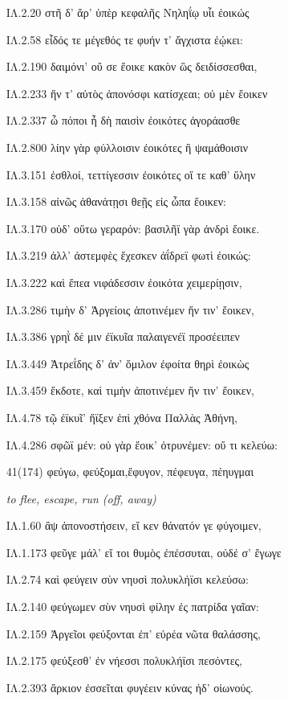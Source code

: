 \begin{enumerate}
{ΙΛ.2.20 στῆ δ' ἄρ' ὑπὲρ κεφαλῆς Νηληΐῳ υἷι ἐοικώς

ΙΛ.2.58 εἶδός τε μέγεθός τε φυήν τ' ἄγχιστα ἐῴκει:

ΙΛ.2.190 δαιμόνι' οὔ σε ἔοικε κακὸν ὣς δειδίσσεσθαι,

ΙΛ.2.233 ἥν τ' αὐτὸς ἀπονόσφι κατίσχεαι; οὐ μὲν ἔοικεν

ΙΛ.2.337 ὦ πόποι ἦ δὴ παισὶν ἐοικότες ἀγοράασθε

ΙΛ.2.800 λίην γὰρ φύλλοισιν ἐοικότες ἢ ψαμάθοισιν

ΙΛ.3.151 ἐσθλοί, τεττίγεσσιν ἐοικότες οἵ τε καθ' ὕλην

ΙΛ.3.158 αἰνῶς ἀθανάτῃσι θεῇς εἰς ὦπα ἔοικεν:

ΙΛ.3.170 οὐδ' οὕτω γεραρόν: βασιλῆϊ γὰρ ἀνδρὶ ἔοικε.

ΙΛ.3.219 ἀλλ' ἀστεμφὲς ἔχεσκεν ἀΐδρεϊ φωτὶ ἐοικώς:

ΙΛ.3.222 καὶ ἔπεα νιφάδεσσιν ἐοικότα χειμερίῃσιν,

ΙΛ.3.286 τιμὴν δ' Ἀργείοις ἀποτινέμεν ἥν τιν' ἔοικεν,

ΙΛ.3.386 γρηῒ δέ μιν ἐϊκυῖα παλαιγενέϊ προσέειπεν

ΙΛ.3.449 Ἀτρεΐδης δ' ἀν' ὅμιλον ἐφοίτα θηρὶ ἐοικὼς

ΙΛ.3.459 ἔκδοτε, καὶ τιμὴν ἀποτινέμεν ἥν τιν' ἔοικεν,

ΙΛ.4.78 τῷ ἐϊκυῖ' ἤϊξεν ἐπὶ χθόνα Παλλὰς Ἀθήνη,

ΙΛ.4.286 σφῶϊ μέν: οὐ γὰρ ἔοικ' ὀτρυνέμεν: οὔ τι κελεύω:
}



 
\clearpage
\item[\large 41(174)]{\large \g φεύγω, φεύξομαι,ἔφυγον, πέφευγα, πέηυγμαι   }

\hspace{0.2cm} \textit{  to flee, escape, run (off, away) }

{\g
ΙΛ.1.60 ἂψ ἀπονοστήσειν, εἴ κεν θάνατόν γε φύγοιμεν,

ΙΛ.1.173 φεῦγε μάλ' εἴ τοι θυμὸς ἐπέσσυται, οὐδέ σ' ἔγωγε

ΙΛ.2.74 καὶ φεύγειν σὺν νηυσὶ πολυκλήϊσι κελεύσω:

ΙΛ.2.140 φεύγωμεν σὺν νηυσὶ φίλην ἐς πατρίδα γαῖαν:

ΙΛ.2.159 Ἀργεῖοι φεύξονται ἐπ' εὐρέα νῶτα θαλάσσης,

ΙΛ.2.175 φεύξεσθ' ἐν νήεσσι πολυκλήϊσι πεσόντες,

ΙΛ.2.393 ἄρκιον ἐσσεῖται φυγέειν κύνας ἠδ' οἰωνούς.

}
\end{enumerate}
